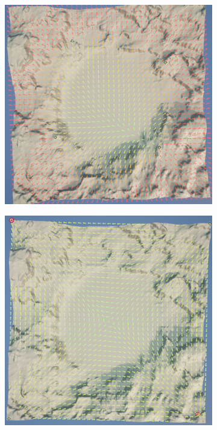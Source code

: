 \documentclass[../main.tex]{subfile}
\begin{document}
\begin{figure}[H]
\begin{subfigure}{.5\textwidth}
    \end{subfigure}
    \begin{subfigure}{.5\textwidth}
        \centering
        \includegraphics[width=.9\textwidth]{Ressources/Map3.png}
    \end{subfigure}%
    \begin{subfigure}{.5\textwidth}
        \centering
        \includegraphics[width=.9\textwidth]{Ressources/Map4.png}

\end{subfigure}
\end{figure}
\end{document}
